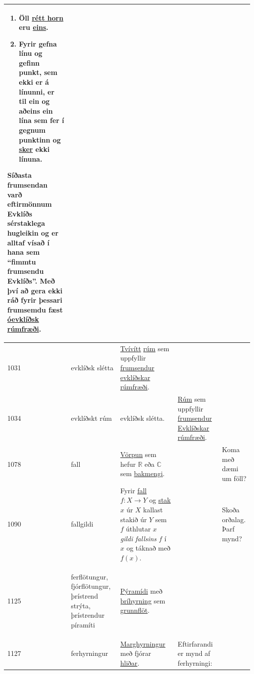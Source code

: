 \begin{longtable}{p{} | p{} | p{} | p{} | p{}}
\begin{enumerate}
    \item Öll \hyperlink{row:4167}{rétt horn} eru \hyperlink{row:0}{eins}.

    \item Fyrir gefna línu og gefinn punkt, sem ekki er á línunni, er til ein og aðeins ein lína sem fer í gegnum punktinn og \hyperlink{row:4771}{sker} ekki línuna.
\end{enumerate}

Síðasta frumsendan varð eftirmönnum Evklíðs sérstaklega hugleikin og er alltaf vísað í hana sem ``fimmtu frumsendu Evklíðs''. Með því að gera ekki ráð fyrir þessari frumsemdu fæst \hyperlink{row:3705}{óevklíðsk rúmfræði}. &  \\
\hline
1031 & \hypertarget{row:1031}{evklíðsk slétta} & \hyperlink{row:5729}{Tvívítt} \hyperlink{row:4266}{rúm} sem uppfyllir \hyperlink{row:1452}{frumsendur} \hyperlink{row:1030}{evklíðskar rúmfræði}. &  &  \\
\hline
1034 & \hypertarget{row:1034}{evklíðskt rúm} & evklíðsk slétta. & \hyperlink{row:4266}{Rúm} sem uppfyllir \hyperlink{row:1452}{frumsendur} \hyperlink{row:1030}{Evklíðskar rúmfræði}. &  \\
\hline
1078 & \hypertarget{row:1078}{fall} & \hyperlink{row:3282}{Vörpun} sem hefur \hyperlink{row:4093}{\(\mathbb{R}\)} eða \hyperlink{row:5682}{\(\mathbb{C}\)} sem \hyperlink{row:74}{bakmengi}. &  & Koma með dæmi um föll? \\
\hline
1090 & \hypertarget{row:1090}{fallgildi} & Fyrir \hyperlink{row:1078}{fall} \(f : X \to Y\) og \hyperlink{row:5128}{stak} \(x\) úr \(X\) kallast stakið úr \(Y\) sem \(f\) úthlutar \(x\) \textit{gildi fallsins} \(f\) í \(x\) og táknað með \(f(x)\). &  & Skoða orðalag. Þarf mynd? \\
\hline
1125 & \hypertarget{row:1125}{ferflötungur, fjórflötungur, þrístrend strýta, þrístrendur píramíti} & \hyperlink{row:5286}{Pýramídi} með \hyperlink{row:6438}{þríhyrning} sem \hyperlink{row:1716}{grunnflöt}. &  &  \\
\hline
1127 & \hypertarget{row:1127}{ferhyrningur} & \hyperlink{row:3161}{Marghyrningur} með fjórar \hyperlink{row:2048}{hliðar}. & Eftirfarandi er mynd af ferhyrningi:


\end{longtable}

